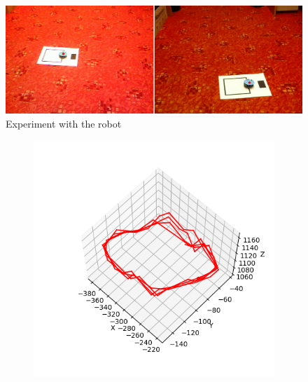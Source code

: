 \begin{figure}
\includegraphics[width=\linewidth]{img/experiments/square-robot.png}
\caption{Experiment with the robot}
\label{fig:robot-square}
\end{figure}

\begin{figure}
\centering
\begin{subfigure}{0.48\linewidth}
	\includegraphics[width=\linewidth]{img/experiments/square-nice.png}
\end{subfigure}
\begin{subfigure}{0.48\linewidth}

\end{subfigure}
\end{figure}
